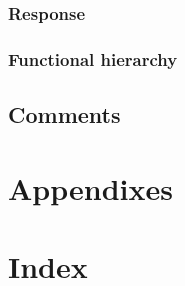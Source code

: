 \documentclass[draftclsnofoot,onecolumn,letterpaper,10pt,compsoc]{IEEEtran}
\begin{document}
		\subsubsection{Response}
		\subsubsection{Functional hierarchy}
	\subsection{Comments}
\section{Appendixes}
\section{Index}

\pagebreak

\end{document}
